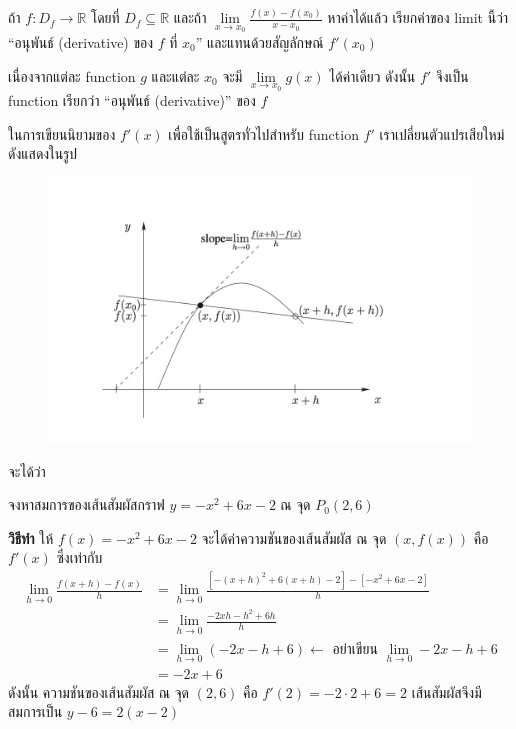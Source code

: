 \documentclass[
]{book}
\begin{document}
ถ้า \(f : D_f \rightarrow \mathbb{R}\) โดยที่ \(D_f \subseteq \mathbb{R}\)
และถ้า \(\underset{x \rightarrow x_0}{\lim} \frac{f(x)-f(x_0)}{x- x_0}\)
หาค่าได้แล้ว เรียกค่าของ limit นี้ว่า ``อนุพันธ์ (derivative) ของ \(f\) ที่ \(x_0\)''
และแทนด้วยสัญลักษณ์ \(f'(x_0)\)

เนื่องจากแต่ละ function \(g\) และแต่ละ \(x_0\) จะมี
\(\underset{x \rightarrow x_0}{\lim}g(x)\) ได้ค่าเดียว ดังนั้น \(f'\) จึงเป็น
function เรียกว่า ``อนุพันธ์ (derivative)'' ของ \(f\)

ในการเขียนนิยามของ \(f'(x)\) เพื่อใช้เป็นสูตรทั่วไปสำหรับ function \(f'\)
เราเปลี่ยนตัวแปรเสียใหม่ ดังแสดงในรูป

\begin{figure}

{\centering \includegraphics[width=0.5\linewidth]{images/fig-derivative-2} 

}

\end{figure}

จะได้ว่า

จงหาสมการของเส้นสัมผัสกราฟ \(y = -x^2 + 6x -2\) ณ จุด \(P_0(2,6)\)

\textbf{วิธีทำ} ให้ \(f(x) = -x^2 + 6x -2\) จะได้ค่าความชันของเส้นสัมผัส ณ จุด
\((x,f(x))\) คือ \(f'(x)\) ซึ่งเท่ากับ \begin{equation}   \begin{aligned}
    \underset{h \rightarrow 0}{\lim}\frac{f(x+h) - f(x)}{h}
        &= \underset{h \rightarrow 0}{\lim}\frac{\left[-(x+h)^2 + 6(x+h)-2 \right]-
        \left[ -x^2 + 6x -2 \right] }{h} \\
        &=\underset{h \rightarrow 0}{\lim}\frac{-2xh-h^2+6h}{h} \\
        &=\underset{h \rightarrow 0}{\lim}(-2x-h+6)
        \leftarrow \boxed{\mbox{ อย่าเขียน $\underset{h \rightarrow 0}{\lim}-2x-h+6$}}\\
        &=-2x+6
  \end{aligned} \end{equation} ดังนั้น ความชันของเส้นสัมผัส ณ จุด \((2,6)\) คือ
\(f'(2) = -2 \cdot 2 + 6 =2\) เส้นสัมผัสจึงมีสมการเป็น \(y - 6 = 2(x-2)\)
\end{document}
